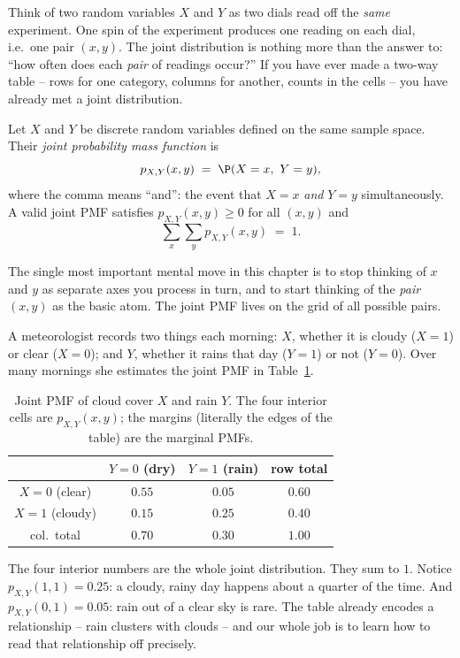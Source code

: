 \begin{intuitionbox}
Think of two random variables $X$ and $Y$ as two dials read off the \emph{same}
experiment. One spin of the experiment produces one reading on each dial, i.e.\
one pair $(x,y)$. The joint distribution is nothing more than the answer to:
``how often does each \emph{pair} of readings occur?'' If you have ever made a
two-way table -- rows for one category, columns for another, counts in the cells
-- you have already met a joint distribution.
\end{intuitionbox}

\begin{definition}
\label{ch13:def-joint-pmf}
Let $X$ and $Y$ be discrete random variables defined on the same sample space.
Their \emph{joint probability mass function} is
\[
  p_{X,Y}(x,y) \;=\; \P(X = x,\ Y = y),
\]
where the comma means ``and'': the event that $X=x$ \emph{and} $Y=y$
simultaneously. A valid joint PMF satisfies $p_{X,Y}(x,y)\ge 0$ for all $(x,y)$
and
\[
  \sum_{x}\sum_{y} p_{X,Y}(x,y) \;=\; 1 .
\]
\end{definition}

The single most important mental move in this chapter is to stop thinking of
$x$ and $y$ as separate axes you process in turn, and to start thinking of the
\emph{pair} $(x,y)$ as the basic atom. The joint PMF lives on the grid of all
possible pairs.

\begin{example}
\label{ch13:ex-weather}
A meteorologist records two things each morning: $X$, whether it is cloudy
($X=1$) or clear ($X=0$); and $Y$, whether it rains that day ($Y=1$) or not
($Y=0$). Over many mornings she estimates the joint PMF in
Table~\ref{ch13:tab-weather}.

\begin{table}[H]
\centering
\begin{tabular}{c|cc|c}
 & $Y=0$ (dry) & $Y=1$ (rain) & row total \\
\hline
$X=0$ (clear)  & $0.55$ & $0.05$ & $0.60$ \\
$X=1$ (cloudy) & $0.15$ & $0.25$ & $0.40$ \\
\hline
col.\ total    & $0.70$ & $0.30$ & $1.00$ \\
\end{tabular}
\caption{Joint PMF of cloud cover $X$ and rain $Y$. The four interior cells are
$p_{X,Y}(x,y)$; the margins (literally the edges of the table) are the marginal
PMFs.}
\label{ch13:tab-weather}
\end{table}

The four interior numbers are the whole joint distribution. They sum to $1$.
Notice $p_{X,Y}(1,1)=0.25$: a cloudy, rainy day happens about a quarter of the
time. And $p_{X,Y}(0,1)=0.05$: rain out of a clear sky is rare. The table
already encodes a relationship -- rain clusters with clouds -- and our whole job
is to learn how to read that relationship off precisely.
\end{example}

